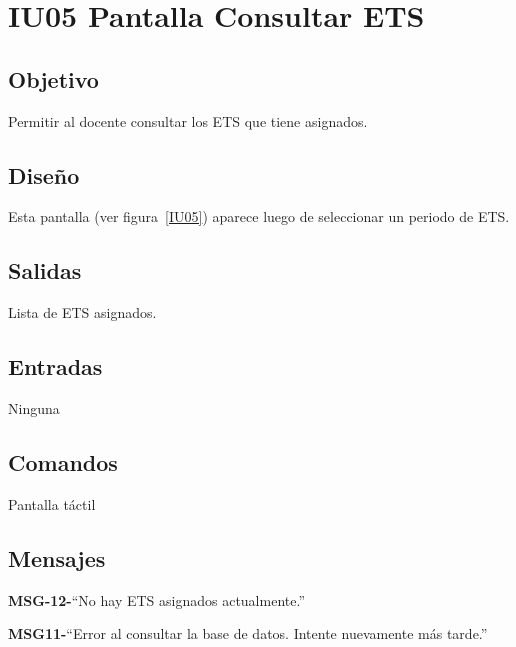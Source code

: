\section{IU05 Pantalla Consultar ETS}

\subsection{Objetivo}
	Permitir al docente consultar los ETS que tiene asignados. 

\subsection{Diseño}
	Esta pantalla  (ver figura~\ref{IU05}) aparece luego de seleccionar un periodo de ETS. 


\subsection{Salidas}
	Lista de ETS asignados. 

\subsection{Entradas}
	Ninguna

\subsection{Comandos}

	Pantalla táctil


\subsection{Mensajes}

\begin{Citemize}
	\item {\bf MSG-12-}{``No hay ETS asignados actualmente.''}
	\item {\bf MSG11-}{``Error al consultar la base de datos. Intente nuevamente más tarde.''}
\end{Citemize}


